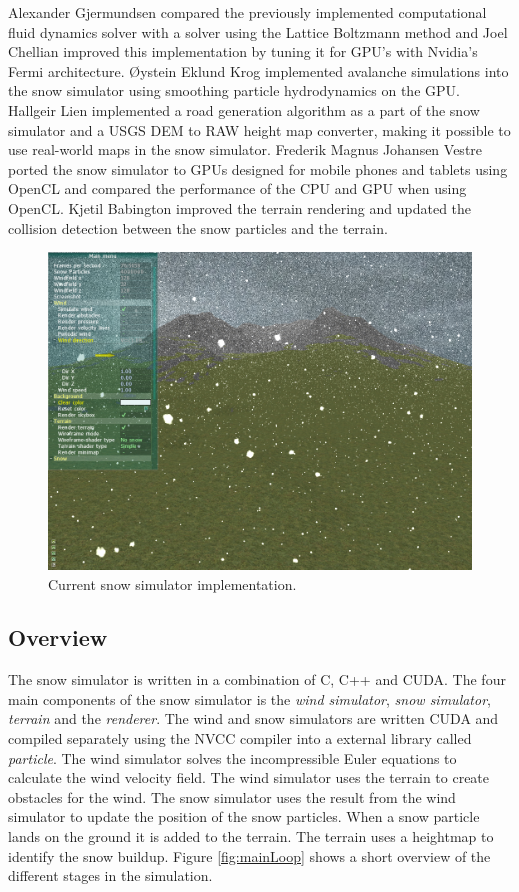 Alexander Gjermundsen\cite{lbmWind} compared the previously implemented computational fluid 
dynamics solver with a solver using the Lattice Boltzmann method and Joel Chellian\cite{fermi} 
improved this implementation by tuning it for GPU's with Nvidia's Fermi architecture. 
Øystein Eklund Krog\cite{avalanche1} implemented avalanche simulations into the snow simulator 
using smoothing particle hydrodynamics on the GPU. 
Hallgeir Lien\cite{road} implemented a road generation algorithm as a part of the snow 
simulator and a USGS DEM to RAW height map converter, making it possible to use 
real-world maps in the snow simulator. 
Frederik Magnus Johansen Vestre\cite{openclSnowThesis} ported the snow simulator to GPUs designed for 
mobile phones and tablets using OpenCL and compared the performance of the CPU and 
GPU when using OpenCL.
Kjetil Babington\cite{snowTerrainThesis} improved the terrain rendering and updated the collision detection 
between the snow particles and the terrain. 


\begin{figure}[ht]
	\center
	\includegraphics[width=1.0\textwidth]{images/snow/gpu/snow7}
	\caption{Current snow simulator implementation.}
	\label{fig:gpuSnow}
\end{figure}

\subsection{Overview}

The snow simulator is written in a combination of C, C++ and CUDA.
The four main components of the snow simulator is the \emph{wind simulator}, 
\emph{snow simulator}, \emph{terrain} and the \emph{renderer}. The wind and 
snow simulators are written CUDA and compiled separately using the NVCC compiler 
into a external library called \emph{particle}. The wind simulator 
solves the incompressible Euler equations to calculate the wind velocity field. 
The wind simulator uses the terrain to create obstacles for the wind. The snow 
simulator uses the result from the wind simulator to update the position of the 
snow particles. When a snow particle lands on the ground it is added to the terrain.
The terrain uses a heightmap to identify the snow buildup. Figure \ref{fig:mainLoop} 
shows a short overview of the different stages in the simulation. 


